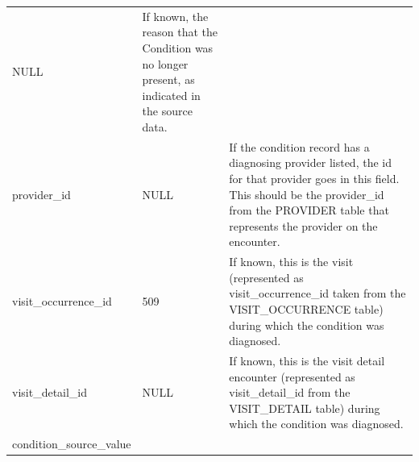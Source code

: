 \documentclass[]{book}
\begin{document}
\begin{longtable}[]{@{}lll@{}}
\begin{minipage}[t]{0.14\columnwidth}
NULL\strut
\end{minipage} & \begin{minipage}[t]{0.50\columnwidth}\raggedright\strut
If known, the reason that the Condition was no longer present, as
indicated in the source data.\strut
\end{minipage}\tabularnewline
\begin{minipage}[t]{0.27\columnwidth}\raggedright\strut
provider\_id\strut
\end{minipage} & \begin{minipage}[t]{0.14\columnwidth}\raggedright\strut
NULL\strut
\end{minipage} & \begin{minipage}[t]{0.50\columnwidth}\raggedright\strut
If the condition record has a diagnosing provider listed, the id for
that provider goes in this field. This should be the provider\_id from
the PROVIDER table that represents the provider on the encounter.\strut
\end{minipage}\tabularnewline
\begin{minipage}[t]{0.27\columnwidth}\raggedright\strut
visit\_occurrence\_id\strut
\end{minipage} & \begin{minipage}[t]{0.14\columnwidth}\raggedright\strut
509\strut
\end{minipage} & \begin{minipage}[t]{0.50\columnwidth}\raggedright\strut
If known, this is the visit (represented as visit\_occurrence\_id taken
from the VISIT\_OCCURRENCE table) during which the condition was
diagnosed.\strut
\end{minipage}\tabularnewline
\begin{minipage}[t]{0.27\columnwidth}\raggedright\strut
visit\_detail\_id\strut
\end{minipage} & \begin{minipage}[t]{0.14\columnwidth}\raggedright\strut
NULL\strut
\end{minipage} & \begin{minipage}[t]{0.50\columnwidth}\raggedright\strut
If known, this is the visit detail encounter (represented as
visit\_detail\_id from the VISIT\_DETAIL table) during which the
condition was diagnosed.\strut
\end{minipage}\tabularnewline
\begin{minipage}[t]{0.27\columnwidth}\raggedright\strut
condition\_source\_value\strut
\end{minipage} & \begin{minipage}[t]{0.14\columnwidth}\raggedright\strut

\end{minipage}
\end{longtable}
\end{document}

